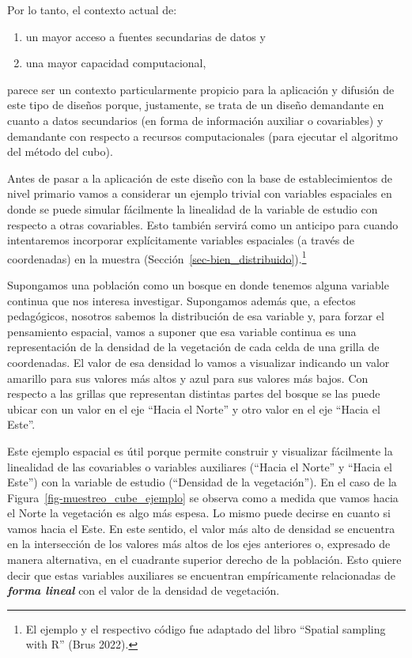 \documentclass[
  spanish,
  a4paper,
]{scrreprt}
\providecommand{\tightlist}{%
  \setlength{\itemsep}{0pt}\setlength{\parskip}{0pt}}
\begin{document}
Por lo tanto, el contexto actual de:

\begin{enumerate}
\def\labelenumi{\alph{enumi})}
\tightlist
\item
  un mayor acceso a fuentes secundarias de datos y
\item
  una mayor capacidad computacional,
\end{enumerate}

\noindent parece ser un contexto particularmente propicio para la
aplicación y difusión de este tipo de diseños porque, justamente, se
trata de un diseño demandante en cuanto a datos secundarios (en forma de
información auxiliar o covariables) y demandante con respecto a recursos
computacionales (para ejecutar el algoritmo del método del cubo).

Antes de pasar a la aplicación de este diseño con la base de
establecimientos de nivel primario vamos a considerar un ejemplo trivial
con variables espaciales en donde se puede simular fácilmente la
linealidad de la variable de estudio con respecto a otras covariables.
Esto también servirá como un anticipo para cuando intentaremos
incorporar explícitamente variables espaciales (a través de coordenadas)
en la muestra (Sección~\ref{sec-bien_distribuido}).\footnote{El ejemplo
  y el respectivo código fue adaptado del libro ``Spatial sampling with
  R'' (Brus 2022).}

Supongamos una población como un bosque en donde tenemos alguna variable
continua que nos interesa investigar. Supongamos además que, a efectos
pedagógicos, nosotros sabemos la distribución de esa variable y, para
forzar el pensamiento espacial, vamos a suponer que esa variable
continua es una representación de la densidad de la vegetación de cada
celda de una grilla de coordenadas. El valor de esa densidad lo vamos a
visualizar indicando un valor amarillo para sus valores más altos y azul
para sus valores más bajos. Con respecto a las grillas que representan
distintas partes del bosque se las puede ubicar con un valor en el eje
``Hacia el Norte'' y otro valor en el eje ``Hacia el Este''.

Este ejemplo espacial es útil porque permite construir y visualizar
fácilmente la linealidad de las covariables o variables auxiliares
(``Hacia el Norte'' y ``Hacia el Este'') con la variable de estudio
(``Densidad de la vegetación''). En el caso de la
Figura~\ref{fig-muestreo_cube_ejemplo} se observa como a medida que
vamos hacia el Norte la vegetación es algo más espesa. Lo mismo puede
decirse en cuanto si vamos hacia el Este. En este sentido, el valor más
alto de densidad se encuentra en la intersección de los valores más
altos de los ejes anteriores o, expresado de manera alternativa, en el
cuadrante superior derecho de la población. Esto quiere decir que estas
variables auxiliares se encuentran empíricamente relacionadas de
\textbf{\emph{forma lineal}} con el valor de la densidad de vegetación.
\end{document}
